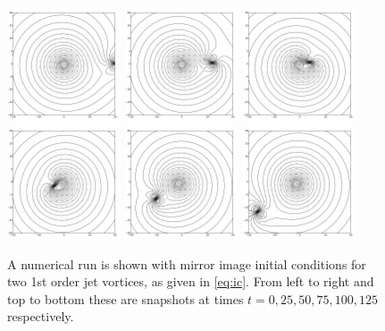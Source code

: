 \documentclass[12pt]{amsart}
\theoremstyle{remark}
\begin{document}
\begin{figure}[h!]
	\centering
	\includegraphics[width=0.3\textwidth]{./images/scattering/frame_time_0}
	\includegraphics[width=0.3\textwidth]{./images/scattering/frame_time_25}
	\includegraphics[width=0.3\textwidth]{./images/scattering/frame_time_50}
	\includegraphics[width=0.3\textwidth]{./images/scattering/frame_time_75}
	\includegraphics[width=0.3\textwidth]{./images/scattering/frame_time_101}
	\includegraphics[width=0.3\textwidth]{./images/scattering/frame_time_126}
	\caption{A numerical run is shown with mirror image initial conditions for two 1st order jet vortices, as given in \eqref{eq:ic}.
		From left to right and top to bottom these are snapshots at times $t=0,25,50,75,100,125$ respectively.}
	\label{fig:scatter}
\end{figure}
\end{document}
